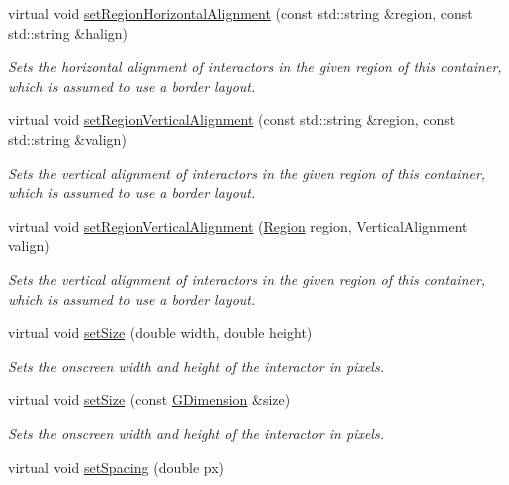 \begin{DoxyCompactItemize}
virtual void \mbox{\hyperlink{classGContainer_aefb97090ff4e149f8a0cce9efee3c451}{set\+Region\+Horizontal\+Alignment}} (const std\+::string \&region, const std\+::string \&halign)
\begin{DoxyCompactList}\small\item\em Sets the horizontal alignment of interactors in the given region of this container, which is assumed to use a border layout. \end{DoxyCompactList}\item 
virtual void \mbox{\hyperlink{classGContainer_afbe22d897ce8ef25db52cbc3d456aa0a}{set\+Region\+Vertical\+Alignment}} (const std\+::string \&region, const std\+::string \&valign)
\begin{DoxyCompactList}\small\item\em Sets the vertical alignment of interactors in the given region of this container, which is assumed to use a border layout. \end{DoxyCompactList}\item 
virtual void \mbox{\hyperlink{classGContainer_a1efb2d3b67fb479aad27a6c0032ee70e}{set\+Region\+Vertical\+Alignment}} (\mbox{\hyperlink{classGContainer_a81a01a86de31071a92e6cce0bab9bc4b}{Region}} region, Vertical\+Alignment valign)
\begin{DoxyCompactList}\small\item\em Sets the vertical alignment of interactors in the given region of this container, which is assumed to use a border layout. \end{DoxyCompactList}\item 
virtual void \mbox{\hyperlink{classGInteractor_aca25d49481f9bf5fc8f7df4c086c4ce7}{set\+Size}} (double width, double height)
\begin{DoxyCompactList}\small\item\em Sets the onscreen width and height of the interactor in pixels. \end{DoxyCompactList}\item 
virtual void \mbox{\hyperlink{classGInteractor_ae2b628228f192c2702c4ce941b2af68f}{set\+Size}} (const \mbox{\hyperlink{classGDimension}{G\+Dimension}} \&size)
\begin{DoxyCompactList}\small\item\em Sets the onscreen width and height of the interactor in pixels. \end{DoxyCompactList}\item 
virtual void \mbox{\hyperlink{classGContainer_a0f85f7b45435b302ae701cb00574bf52}{set\+Spacing}} (double px)

\end{DoxyCompactItemize}
